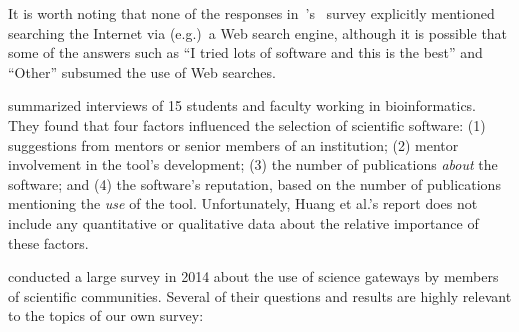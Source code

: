 \documentclass[review]{elsarticle}
\begin{document}
It is worth noting that none of the responses in~\citeauthor{joppa2013troubling}'s~\citeyear{joppa2013troubling} survey explicitly mentioned searching the Internet via (e.g.)\ a Web search engine, although it is possible that some of the answers such as ``I tried lots of software and this is the best'' and ``Other'' subsumed the use of Web searches.

\citet{huang2013provenance} summarized interviews of 15 students and faculty working in bioinformatics.  They found that four factors influenced the selection of scientific software: (1) suggestions from mentors or senior members of an institution; (2) mentor involvement in the tool's development; (3) the number of publications \emph{about} the software; and (4) the software's reputation, based on the number of publications mentioning the \emph{use} of the tool.  Unfortunately, Huang et al.'s report does not include any quantitative or qualitative data about the relative importance of these factors.

\citet{lawrence2015science, lawrence2014who} conducted a large survey in 2014 about the use of science gateways by members of scientific communities.  Several of their questions and results are highly relevant to the topics of our own survey:
\end{document}
